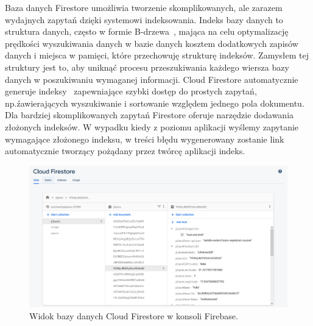         Baza danych Firestore umożliwia tworzenie skomplikowanych, ale zarazem wydajnych zapytań dzięki systemowi indeksowania. Indeks bazy danych to struktura danych, 
        często w formie B-drzewa~\cite{DBSYS}, mająca na celu optymalizację prędkości wyszukiwania danych w bazie danych kosztem dodatkowych zapisów danych i miejsca w pamięci, 
        które przechowuję strukturę indeksów. Zamysłem tej struktury jest to, aby uniknąć procesu przeszukiwania każdego wiersza bazy danych w poszukiwaniu wymaganej informacji. Cloud Firestore
        automatycznie generuje indeksy~\cite{FIRESTORE_IDX} zapewniające szybki dostęp do prostych zapytań, np.\' zawierających wyszukiwanie i sortowanie względem jednego pola dokumentu. Dla bardziej 
        skomplikowanych zapytań Firestore oferuje narzędzie dodawania złożonych indeksów. W wypadku kiedy z poziomu aplikacji wyślemy zapytanie wymagające złożonego indeksu, w treści błędu wygenerowany 
        zostanie link automatycznie tworzący pożądany przez twórcę aplikacji indeks. \\

        \vspace{1cm}
        \begin{figure}[!ht]%
            \centering
            \includegraphics[scale=0.40]{src/firestore_screen.png}
            \caption{Widok bazy danych Cloud Firestore w konsoli Firebase.\label{firestore_screen}}
            \qquad
        \end{figure} 

\newpage
